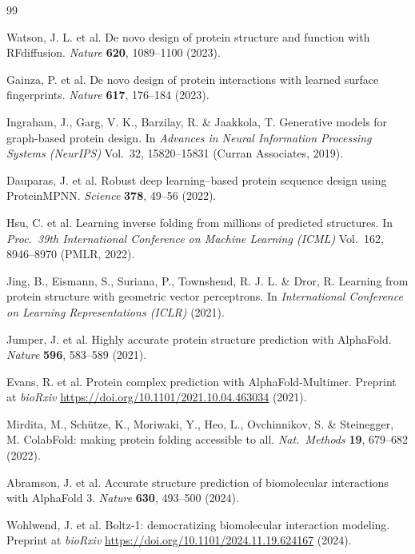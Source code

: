 \documentclass[10pt,twocolumn]{article}
\begin{document}
\begin{thebibliography}{99}

Watson, J. L. et al. De novo design of protein structure and function with RFdiffusion. \textit{Nature} \textbf{620}, 1089--1100 (2023).

Gainza, P. et al. De novo design of protein interactions with learned surface fingerprints. \textit{Nature} \textbf{617}, 176--184 (2023).

Ingraham, J., Garg, V. K., Barzilay, R. \& Jaakkola, T. Generative models for graph-based protein design. In \textit{Advances in Neural Information Processing Systems (NeurIPS)} Vol.\ 32, 15820--15831 (Curran Associates, 2019).

Dauparas, J. et al. Robust deep learning--based protein sequence design using ProteinMPNN. \textit{Science} \textbf{378}, 49--56 (2022).

Hsu, C. et al. Learning inverse folding from millions of predicted structures. In \textit{Proc.\ 39th International Conference on Machine Learning (ICML)} Vol.\ 162, 8946--8970 (PMLR, 2022).

Jing, B., Eismann, S., Suriana, P., Townshend, R. J. L. \& Dror, R. Learning from protein structure with geometric vector perceptrons. In \textit{International Conference on Learning Representations (ICLR)} (2021).

Jumper, J. et al. Highly accurate protein structure prediction with AlphaFold. \textit{Nature} \textbf{596}, 583--589 (2021).

Evans, R. et al. Protein complex prediction with AlphaFold-Multimer. Preprint at \textit{bioRxiv} \url{https://doi.org/10.1101/2021.10.04.463034} (2021).

Mirdita, M., Sch{\"u}tze, K., Moriwaki, Y., Heo, L., Ovchinnikov, S. \& Steinegger, M. ColabFold: making protein folding accessible to all. \textit{Nat.\ Methods} \textbf{19}, 679--682 (2022).

Abramson, J. et al. Accurate structure prediction of biomolecular interactions with AlphaFold 3. \textit{Nature} \textbf{630}, 493--500 (2024).

Wohlwend, J. et al. Boltz-1: democratizing biomolecular interaction modeling. Preprint at \textit{bioRxiv} \url{https://doi.org/10.1101/2024.11.19.624167} (2024).


\end{thebibliography}
\end{document}
